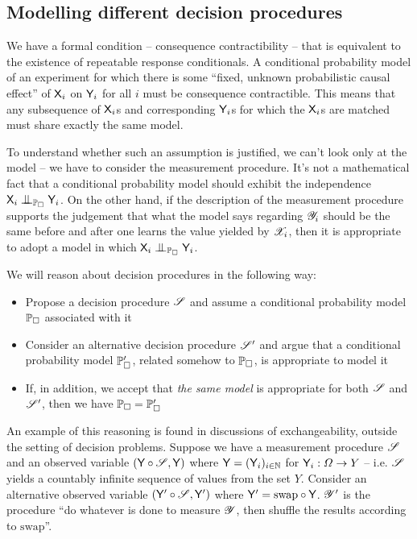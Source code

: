 \subsection{Modelling different decision procedures}

We have a formal condition -- consequence contractibility -- that is equivalent to the existence of repeatable response conditionals. A conditional probability model of an experiment for which there is some ``fixed, unknown probabilistic causal effect'' of $\mathsf{X}_i$ on $\mathsf{Y}_i$ for all $i$ must be consequence contractible. This means that any subsequence of $\mathsf{X}_i$s and corresponding $\mathsf{Y}_i$s for which the $\mathsf{X}_i$s are matched must share exactly the same model. 

To understand whether such an assumption is justified, we can't look only at the model -- we have to consider the measurement procedure. It's not a mathematical fact that a conditional probability model should exhibit the independence $\RV{X}_i\CI_{\prob{P}_\square} \RV{Y}_i$. On the other hand, if the description of the measurement procedure supports the judgement that what the model says regarding $\mathscr{Y}_i$ should be the same before and after one learns the value yielded by $\mathscr{X}_i$, then it is appropriate to adopt a model in which $\RV{X}_i\CI_{\prob{P}_\square} \RV{Y}_i$.

We will reason about decision procedures in the following way:

\begin{itemize}
    \item Propose a decision procedure $\mathscr{S}$ and assume a conditional probability model $\mathbb{P}_\square$ associated with it
    \item Consider an alternative decision procedure $\mathscr{S}'$ and argue that a conditional probability model $\mathbb{P}_\square'$, related somehow to $\mathbb{P}_\square$, is appropriate to model it
    \item If, in addition, we accept that \emph{the same model} is appropriate for both $\mathscr{S}$ and $\mathscr{S}'$, then we have $\mathbb{P}_\square=\mathbb{P}_\square'$
\end{itemize}

An example of this reasoning is found in discussions of exchangeability, outside the setting of decision problems. Suppose we have a measurement procedure $\mathscr{S}$ and an observed variable $(\mathsf{Y}\circ\mathscr{S},\mathsf{Y})$ where $\mathsf{Y}=(\mathsf{Y}_i)_{i\in \mathbb{N}}$ for $\mathsf{Y}_i:\Omega\to Y$ -- i.e. $\mathscr{S}$ yields a countably infinite sequence of values from the set $Y$. Consider an alternative observed variable $(\mathsf{Y}'\circ\mathscr{S},\mathsf{Y}')$ where $\mathsf{Y}'=\text{swap}\circ\mathsf{Y}$. $\mathscr{Y}'$ is the procedure ``do whatever is done to measure $\mathscr{Y}$, then shuffle the results according to $\text{swap}$''.

